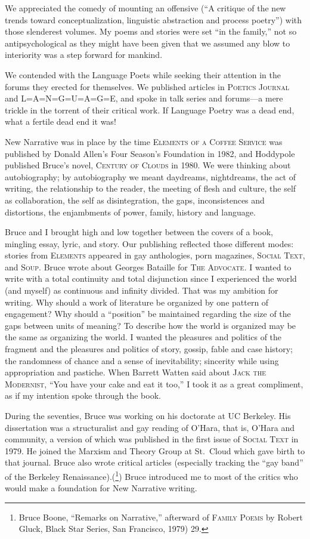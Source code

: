 \documentclass[
]{memoir}
\begin{document}
We appreciated the comedy of mounting an offensive (``A critique of the
new trends toward conceptualization, linguistic abstraction and process
poetry'') with those slenderest volumes. My poems and stories were set
``in the family,'' not so antipsychological as they might have been
given that we assumed any blow to interiority was a step forward for
mankind.

We contended with the Language Poets while seeking their attention in
the forums they erected for themselves. We published articles in
\textsc{Poetics Journal} and \textsc{L=A=N=G=U=A=G=E}, and spoke in talk
series and forums---a mere trickle in the torrent of their critical
work. If Language Poetry was a dead end, what a fertile dead end it was!

New Narrative was in place by the time \textsc{Elements of a Coffee
Service} was published by Donald Allen's Four Season's Foundation in
1982, and Hoddypole published Bruce's novel, \textsc{Century of Clouds}
in 1980. We were thinking about autobiography; by autobiography we meant
daydreams, nightdreams, the act of writing, the relationship to the
reader, the meeting of flesh and culture, the self as collaboration, the
self as disintegration, the gaps, inconsistences and distortions, the
enjambments of power, family, history and language.

Bruce and I brought high and low together between the covers of a book,
mingling essay, lyric, and story. Our publishing reflected those
different modes: stories from \textsc{Elements} appeared in gay
anthologies, porn magazines, \textsc{Social Text}, and \textsc{Soup}.
Bruce wrote about Georges Bataille for \textsc{The Advocate}\emph{. } I
wanted to write with a total continuity and total disjunction since I
experienced the world (and myself) as continuous and infinity divided.
That was my ambition for writing. Why should a work of literature be
organized by one pattern of engagement? Why should a ``position'' be
maintained regarding the size of the gaps between units of meaning? To
describe how the world is organized may be the same as organizing the
world. I wanted the pleasures and politics of the fragment and the
pleasures and politics of story, gossip, fable and case history; the
randomness of chance and a sense of inevitability; sincerity while using
appropriation and pastiche. When Barrett Watten said about \textsc{Jack
the Modernist}, ``You have your cake and eat it too,'' I took it as a
great compliment, as if my intention spoke through the book.

During the seventies, Bruce was working on his doctorate at UC Berkeley.
His dissertation was a structuralist and gay reading of O'Hara, that is,
O'Hara and community, a version of which was published in the first
issue of \textsc{Social Text} in 1979. He joined the Marxism and Theory
Group at St.~Cloud which gave birth to that journal. Bruce also wrote
critical articles (especially tracking the ``gay band'' of the Berkeley
Renaissance).(\footnote{Bruce Boone, ``Remarks on Narrative,'' afterward
  of \textsc{Family Poems} by Robert Gluck, Black Star Series, San
  Francisco, 1979) 29.}) Bruce introduced me to most of the critics who
would make a foundation for New Narrative writing.
\end{document}
